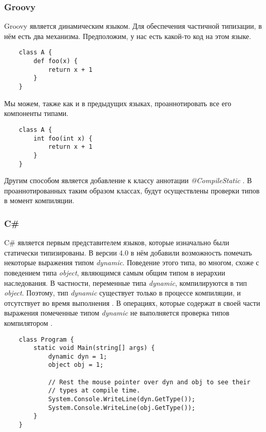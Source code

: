 \subsubsection{Groovy}

Groovy является динамическим языком. Для обеспечения частичной типизации, в нём есть два механизма. Предположим, у нас есть какой-то код на этом языке.

\begin{verbatim}
    class A {
        def foo(x) {
            return x + 1
        }
    }
\end{verbatim}

Мы можем, также как и в предыдущих языках, проаннотировать все его компоненты типами.

\begin{verbatim}
    class A {
        int foo(int x) {
            return x + 1
        }
    }
\end{verbatim}

Другим способом является добавление к классу аннотации \textit{@CompileStatic} \cite{groovy:compileStatic}. В проаннотированных таким образом классах, будут осуществлены проверки типов в момент компиляции.



\subsubsection{C{\#}}

    C{\#} является первым представителем языков, которые изначально были статически типизированы. В версии 4.0 в нём добавили возможность помечать некоторые выражения типом \textit{dynamic}. Поведение этого типа, во многом, схоже с поведением типа \textit{object}, являющимся самым общим типом в иерархии наследования. В частности, переменные типа \textit{dynamic}, компилируются в тип \textit{object}. Поэтому, тип  \textit{dynamic} существует только в процессе компиляции, и отсутствует во время выполнения \cite{msdn:dynamicType}. В операциях, которые содержат в своей части выражения помеченные типом \textit{dynamic} не выполняется проверка типов компилятором \cite{book:troelsen2012proCSharp}.

\begin{verbatim}
    class Program {
        static void Main(string[] args) {
            dynamic dyn = 1;
            object obj = 1;

            // Rest the mouse pointer over dyn and obj to see their
            // types at compile time.
            System.Console.WriteLine(dyn.GetType());
            System.Console.WriteLine(obj.GetType());
        }
    }
\end{verbatim}

